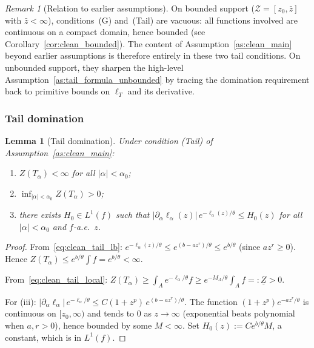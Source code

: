 \documentclass[12pt,a4paper]{article}
\theoremstyle{definition}
\theoremstyle{plain}
\newtheorem{lemma}{Lemma}[section]
\theoremstyle{remark}
\newtheorem{remark}{Remark}[section]
\newcommand{\zbar}{\bar{z}}
\newcommand{\zlow}{z_{\scriptscriptstyle 0}}
\newcommand{\calZ}{\mathcal{Z}}
\begin{document}
\begin{remark}[Relation to earlier assumptions]
\label{rem:clean_relation}
On bounded support ($\calZ = [\zlow,\zbar]$ with $\zbar < \infty$), conditions~\textup{(G)} and~\textup{(Tail)} are vacuous: all functions involved are continuous on a compact domain, hence bounded (see Corollary~\ref{cor:clean_bounded}).  The content of Assumption~\ref{as:clean_main} beyond earlier assumptions is therefore entirely in these two tail conditions.  On unbounded support, they sharpen the high-level Assumption~\ref{as:tail_formula_unbounded} by tracing the domination requirement back to primitive bounds on $\ell_T$ and its derivative.
\end{remark}


\subsubsection{Tail domination}

\begin{lemma}[Tail domination]
\label{lem:clean_tail}
Under condition \textup{(Tail)} of Assumption~\ref{as:clean_main}:
\begin{enumerate}[label=(\roman*)]
\item $Z(T_\alpha) < \infty$ for all $|\alpha| < \alpha_0$;
\item $\inf_{|\alpha|<\alpha_0} Z(T_\alpha) > 0$;
\item there exists $H_0 \in L^1(f)$ such that $|\partial_\alpha \ell_\alpha(z)|\,e^{-\ell_\alpha(z)/\theta} \le H_0(z)$ for all $|\alpha| < \alpha_0$ and $f$-a.e.\ $z$.
\end{enumerate}
\end{lemma}

\begin{proof}
From~\eqref{eq:clean_tail_lb}: $e^{-\ell_\alpha(z)/\theta} \le e^{(b-az^r)/\theta} \le e^{b/\theta}$ (since $az^r \ge 0$).  Hence $Z(T_\alpha) \le e^{b/\theta}\int f = e^{b/\theta} < \infty$.

From~\eqref{eq:clean_tail_local}: $Z(T_\alpha) \ge \int_A e^{-\ell_\alpha/\theta}f \ge e^{-M_A/\theta}\int_A f =: \underline{Z} > 0$.

For (iii): $|\partial_\alpha \ell_\alpha|\,e^{-\ell_\alpha/\theta} \le C(1+z^p)\,e^{(b-az^r)/\theta}$.  The function $(1+z^p)e^{-az^r/\theta}$ is continuous on $[\zlow,\infty)$ and tends to $0$ as $z \to \infty$ (exponential beats polynomial when $a,r > 0$), hence bounded by some $M < \infty$.  Set $H_0(z) := Ce^{b/\theta}M$, a constant, which is in $L^1(f)$.
\end{proof}
\end{document}
